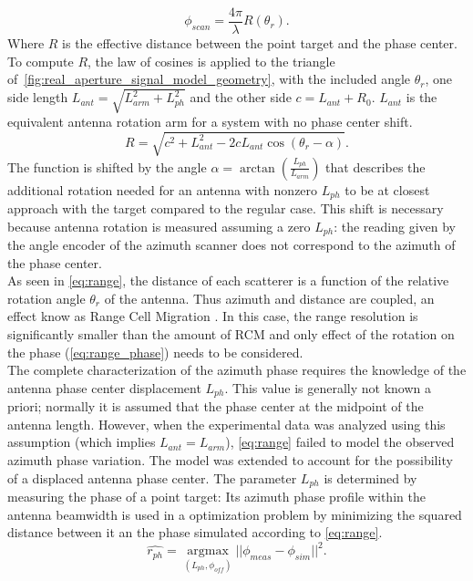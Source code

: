 \begin{equation}\label{eq:range_phase}
	\phi_{scan} = \frac{4 \pi}{\lambda}R\left(\theta_r\right).
\end{equation}
Where $R$ is the effective distance between the point target and the phase center.
To compute $R$, the law of cosines is applied to the triangle of~\autoref{fig:real_aperture_signal_model_geometry}, with the included angle $\theta_r$, one side length $L_{ant} = \sqrt{L_{arm}^2 + L_{ph}^2}$ and the other side $c = L_{ant} + R_0$.  $L_{ant}$ is the equivalent antenna rotation arm for a system with no phase center shift.
\begin{equation}\label{eq:range}
	R = \sqrt{ c^2 +  L_{ant}^2 - 2 c L_{ant} \cos{\left(\theta_r - \alpha\right)}}.
\end{equation}
The function is shifted by the angle  $\alpha = \operatorname{\arctan}\left({\frac{L_{ph}}{L_{arm}}}\right)$ that describes the additional rotation needed for an antenna with nonzero $L_{ph}$ to be at closest approach with the target compared to the regular case. This shift is necessary because antenna rotation is measured assuming a zero $L_{ph}$: the reading given by the angle encoder of  the azimuth scanner does not correspond to the azimuth of the phase center.\\
As seen in \autoref{eq:range}, the distance of each scatterer is a function of the relative rotation angle $\theta_r$ of the antenna. Thus azimuth and distance are coupled, an effect know as Range Cell Migration . In this case, the range resolution is significantly smaller than the amount of RCM and only effect of the rotation on the phase (\autoref{eq:range_phase}) needs to be considered.\\
The complete characterization of the azimuth phase requires the knowledge of the antenna phase center displacement $L_{ph}$. This value is generally not known a priori; normally it is assumed that the phase center at the midpoint of the antenna length. However, when the experimental data was analyzed using this assumption (which implies $L_{ant} = L_{arm}$),  \autoref{eq:range} failed to model the observed azimuth phase variation. The model was extended to account for the possibility of a displaced antenna phase center. The parameter $L_{ph}$ is determined by measuring the phase of a point target: Its azimuth phase profile within the antenna beamwidth is used in a optimization problem by minimizing the squared distance between it an the phase simulated according to \autoref{eq:range}.
\begin{equation}\label{eq:rph_estimation}
	\hat{r_{ph}} = \underset{\left(L_{ph}, \phi_{off}\right)}{\operatorname{argmax}}{\vert\vert\phi_{meas} - \phi_{sim}\vert\vert}^2.
\end{equation}
